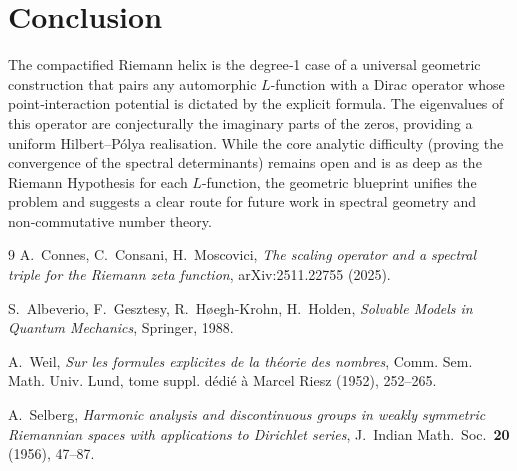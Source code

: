 \documentclass[12pt,a4paper]{article}
\begin{document}
\section{Conclusion}

The compactified Riemann helix is the degree‑1 case of a universal geometric construction that pairs any automorphic \(L\)-function with a Dirac operator whose point‑interaction potential is dictated by the explicit formula. The eigenvalues of this operator are conjecturally the imaginary parts of the zeros, providing a uniform Hilbert–P\'olya realisation. While the core analytic difficulty (proving the convergence of the spectral determinants) remains open and is as deep as the Riemann Hypothesis for each \(L\)-function, the geometric blueprint unifies the problem and suggests a clear route for future work in spectral geometry and non‑commutative number theory.

\begin{thebibliography}{9}
A.~Connes, C.~Consani, H.~Moscovici,
\emph{The scaling operator and a spectral triple for the Riemann zeta function},
arXiv:2511.22755 (2025).

S.~Albeverio, F.~Gesztesy, R.~H{\o}egh-Krohn, H.~Holden,
\emph{Solvable Models in Quantum Mechanics},
Springer, 1988.

A.~Weil,
\emph{Sur les formules explicites de la th\'eorie des nombres},
Comm. Sem. Math. Univ. Lund, tome suppl. d\'edi\'e \`a Marcel Riesz (1952), 252--265.

A.~Selberg,
\emph{Harmonic analysis and discontinuous groups in weakly symmetric Riemannian spaces with applications to Dirichlet series},
J.~Indian Math.~Soc.~\textbf{20} (1956), 47--87.
\end{thebibliography}
\end{document}
